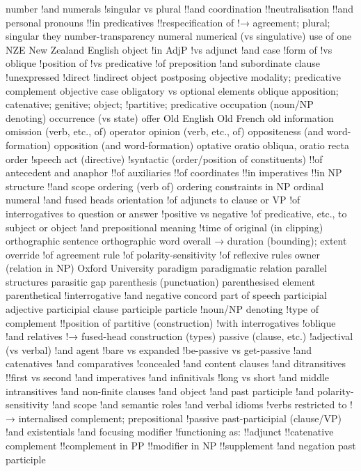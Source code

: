 number
!and numerals
!singular vs plural
!!and coordination
!!neutralisation
!!and personal pronouns
!!in predicatives
!!respecification of
!→ agreement; plural; singular they
number-transparency
numeral
numerical (vs singulative) use of one
NZE New Zealand English
object
!in AdjP
!vs adjunct
!and case
!form of
!vs oblique
!position of
!vs predicative
!of preposition
!and subordinate clause
!unexpressed
!direct
!indirect
object postposing
objective modality; predicative complement
objective case
obligatory vs optional elements
oblique apposition; catenative; genitive; object;
!partitive; predicative
occupation (noun/NP denoting)
occurrence (vs state)
offer
Old English
Old French
old information
omission (verb, etc., of)
operator
opinion (verb, etc., of)
oppositeness (and word-formation)
opposition (and word-formation)
optative
oratio obliqua, oratio recta
order
!speech act (directive)
!syntactic (order/position of constituents)
!!of antecedent and anaphor
!!of auxiliaries
!!of coordinates
!!in imperatives
!!in NP structure
!!and scope
ordering (verb of)
ordering constraints in NP
ordinal numeral
!and fused heads
orientation
!of adjuncts to clause or VP
!of interrogatives to question or answer
!positive vs negative
!of predicative, etc., to subject or object
!and prepositional meaning
!time of
original (in clipping)
orthographic sentence
orthographic word
overall → duration (bounding); extent
override
!of agreement rule
!of polarity-sensitivity
!of reflexive rules
owner (relation in NP)
Oxford University
paradigm
paradigmatic relation
parallel structures
parasitic gap
parenthesis (punctuation)
parenthesised element
parenthetical
!interrogative
!and negative concord
part of speech
participial adjective
participial clause
participle
particle
!noun/NP denoting
!type of complement
!!position of
partitive (construction)
!with interrogatives
!oblique
!and relatives
!→ fused-head construction (types)
passive (clause, etc.)
!adjectival (vs verbal)
!and agent
!bare vs expanded
!be-passive vs get-passive
!and catenatives
!and comparatives
!concealed
!and content clauses
!and ditransitives
!!first vs second
!and imperatives
!and infinitivals
!long vs short
!and middle intransitives
!and non-finite clauses
!and object
!and past participle
!and polarity-sensitivity
!and scope
!and semantic roles
!and verbal idioms
!verbs restricted to
!→ internalised complement; prepositional
!passive
past-participial (clause/VP)
!and existentials
!and focusing modifier
!functioning as:
!!adjunct
!!catenative complement
!!complement in PP
!!modifier in NP
!!supplement
!and negation
past participle
